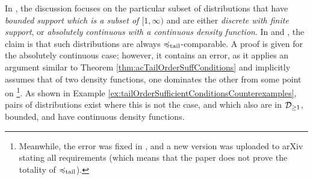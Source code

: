 \documentclass[a4paper]{scrreprt}
\theoremstyle{definition}
\begin{document}
    In \cite{bib:rassGameRiskManagI,bib:rassTotalOrderingOnLossDistributions}, the discussion focuses on the particular subset of distributions that have \emph{bounded support which is a subset of $[1, \infty)$} and are either \emph{discrete with finite support}, or \emph{absolutely continuous with a continuous density function}.
    In \cite[Lemma 2]{bib:rassTotalOrderingOnLossDistributions} and \cite[Lemma 2.4]{bib:rassGameRiskManagI}, the claim is that such distributions are always $\preccurlyeq_{\text{tail}}$-comparable.
    A proof is given for the absolutely continuous case; however, it contains an error, as it applies an argument similar to Theorem \ref{thm:acTailOrderSuffConditions} and implicitly assumes that of two density functions, one dominates the other from some point on
    \footnote{Meanwhile, the error was fixed in \cite{bib:rassGameRiskManagI}, and a new version was uploaded to arXiv stating all requirements (which means that the paper does not prove the totality of $\preccurlyeq_{\text{tail}}$).}.
    As shown in Example \ref{ex:tailOrderSufficientConditionsCounterexamples}, pairs of distributions exist where this is not the case, and which also are in $\mathcal{D}_{\geq1}$, bounded, and have continuous density functions.
    
\end{document}
